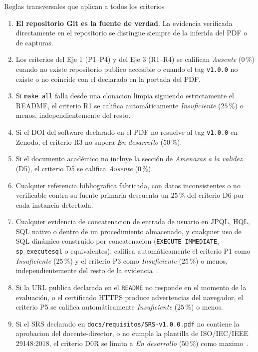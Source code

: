 \documentclass[11pt,a4paper]{article}
\begin{document}
\begin{cajacritica}{Reglas transversales que aplican a todos los criterios}
    \begin{enumerate}
        \item \textbf{El repositorio Git es la fuente de verdad}. La evidencia verificada directamente en el repositorio se distingue siempre de la inferida del PDF o de capturas.
        \item Los criterios del Eje 1 (P1--P4) y del Eje 3 (R1--R4) se califican \emph{Ausente} ($0$\,\%) cuando no existe repositorio publico accesible o cuando el tag \texttt{v1.0.0} no existe o no coincide con el declarado en la portada del PDF.
        \item Si \texttt{make all} falla desde una clonacion limpia siguiendo estrictamente el README, el criterio R1 se califica autom\'{a}ticamente \emph{Insuficiente} ($25$\,\%) o menos, independientemente del resto.
        \item Si el DOI del software declarado en el PDF no resuelve al tag \texttt{v1.0.0} en Zenodo, el criterio R3 no supera \emph{En desarrollo} ($50$\,\%).
        \item Si el documento acad\'{e}mico no incluye la secci\'{o}n de \emph{Amenazas a la validez} (D5), el criterio D5 se califica \emph{Ausente} ($0$\,\%).
        \item Cualquier referencia bibliografica fabricada, con datos inconsistentes o no verificable contra su fuente primaria descuenta un $25$\,\% del criterio D6 por cada instancia detectada.
        \item Cualquier evidencia de concatenacion de entrada de usuario en JPQL, HQL, SQL nativo o dentro de un procedimiento almacenado, y cualquier uso de SQL din\'{a}mico construido por concatenacion (\texttt{EXECUTE IMMEDIATE}, \texttt{sp\_executesql} o equivalentes), califica autom\'{a}ticamente el criterio P1 como \emph{Insuficiente} ($25$\,\%) y el criterio P3 como \emph{Insuficiente} ($25$\,\%) o menos, independientemente del resto de la evidencia~\cite{owaspsqlicheatsheet,owasp2021top10}.
        \item Si la URL publica declarada en el \texttt{README} no responde en el momento de la evaluaci\'{o}n, o el certificado HTTPS produce advertencias del navegador, el criterio P5 se califica autom\'{a}ticamente \emph{Insuficiente} ($25$\,\%) o menos.
        \item Si el SRS declarado en \texttt{docs/requisitos/SRS-v1.0.0.pdf} no contiene la aprobacion del docente-director, o no cumple la plantilla de ISO/IEC/IEEE 29148:2018, el criterio D0R se limita a \emph{En desarrollo} ($50$\,\%) como maximo~\cite{iso29148}.

\end{enumerate}
\end{cajacritica}
\end{document}
